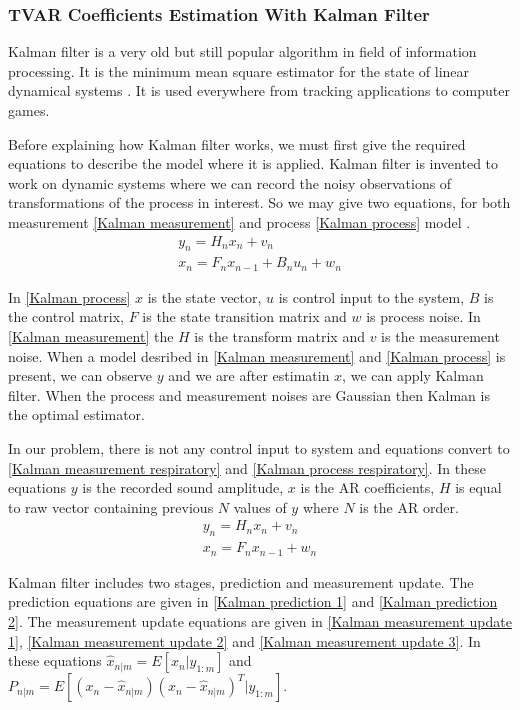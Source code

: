 \subsubsection{TVAR Coefficients Estimation With Kalman Filter}
Kalman filter is a very old but still popular algorithm in field of information processing. It is the minimum mean square estimator for the state of linear dynamical systems \cite{kalman-neural}. It is used everywhere from tracking applications to computer games. \par
Before explaining how Kalman filter works, we must first give the required equations to describe the model where it is applied. Kalman filter is invented to work on dynamic systems where we can record the noisy observations of transformations of the process in interest. So we may give two equations, for both measurement \eqref{Kalman measurement} and process \eqref{Kalman process} model \cite{kalman-seismic}.
\begin{align}
	y_n = H_nx_{n} + v_n \label{Kalman measurement}	\\
	x_n = F_n x_{n-1} + B_n u_n + w_n \label{Kalman process}	
\end{align} \par
In \eqref{Kalman process} $x$ is the state vector, $u$ is control input to the system, $B$ is the control matrix, $F$ is the state transition matrix and $w$ is process noise. In \eqref{Kalman measurement} the $H$ is the transform matrix and $v$ is the measurement noise. When a model desribed in \eqref{Kalman measurement} and \eqref{Kalman process} is present, we can observe $y$ and we are after estimatin $x$, we can apply Kalman filter. When the process and measurement noises are Gaussian then Kalman is the optimal estimator. \par
In our problem, there is not any control input to system and equations convert to \eqref{Kalman measurement respiratory} and \eqref{Kalman process respiratory}. In these equations $y$ is the recorded sound amplitude, $x$ is the AR coefficients, $H$ is equal to raw vector containing previous $N$ values of $y$ where $N$ is the AR order.
\begin{align}
	y_n = H_nx_{n} + v_n \label{Kalman measurement respiratory}	\\
	x_n = F_n x_{n-1} + w_n \label{Kalman process respiratory}	
\end{align} \par
Kalman filter includes two stages, prediction and measurement update. The prediction equations are given in \eqref{Kalman prediction 1} and \eqref{Kalman prediction 2}. The measurement update equations are given in \eqref{Kalman measurement update 1}, \eqref{Kalman measurement update 2} and \eqref{Kalman measurement update 3}. In these equations $\hat{x}_{n|m} = E[x_{n}|y_{1:m}]$ and $P_{n|m} = E[(x_n-\hat{x}_{n|m})(x_n-\hat{x}_{n|m})^T|y_{1:m}]$. \par
